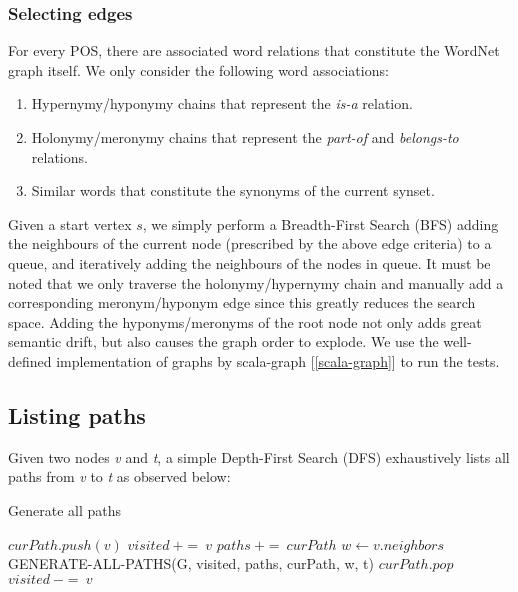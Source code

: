\subsubsection{Selecting edges}
For every POS, there are associated word relations that constitute the WordNet graph itself. We 
only consider the following word associations: 

\begin{enumerate}
\item Hypernymy/hyponymy chains that represent the \emph{is-a} relation.
\item Holonymy/meronymy chains that represent the \emph{part-of} and \emph{belongs-to} relations.
\item Similar words that constitute the synonyms of the current synset.
\end{enumerate}

Given a start vertex $s$, we simply perform a Breadth-First Search (BFS) adding the neighbours of
the current node (prescribed by the above edge criteria) to a queue, and iteratively adding the
neighbours of the nodes in queue. It must be noted that we only traverse the holonymy/hypernymy
chain and manually add a corresponding meronym/hyponym edge since this greatly reduces the search
space. Adding the hyponyms/meronyms of the root node not only adds great semantic drift, but 
also causes the graph order to explode. We use the well-defined implementation of graphs by
scala-graph [\ref{scala-graph}] to run the tests.

\subsection{Listing paths}
Given two nodes \emph{v} and \emph{t}, a simple Depth-First Search (DFS) exhaustively lists
all paths from \emph{v} to \emph{t} as observed below:

\begin{algorithm}
\caption{Generate all paths}
  \begin{algorithmic}[1]
    \State $curPath.push(v)$
    \State $visited\ +=\ v$
      \State $paths\ +=\ curPath$
      \Else 
        \State $w \gets v.neighbors$
            \State GENERATE-ALL-PATHS(G, visited, paths, curPath, w, t)
          \EndIf
    \EndIf
    \State $curPath.pop$
    \State $visited\ -=\ v$
    \EndProcedure
  \end{algorithmic}
\end{algorithm}

